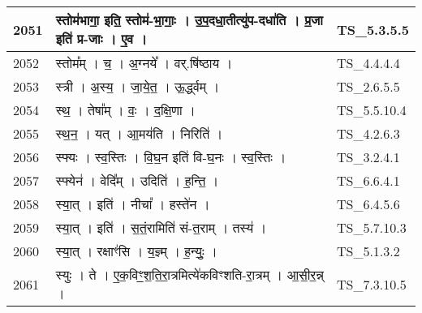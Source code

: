 \documentclass[17pt]{extarticle}
\begin{document}
\begin{longtable}{||p{0.4in}||p{4.9in}||p{0.9in}||}
    2051 & स्तोम॑भागा॒ इति॒ स्तोम॑{-}भा॒गाः॒   ।   उ॒प॒दधा॒तीत्यु॑प{-}दधा॑ति   ।   प्र॒जा इति॑ प्र{-}जाः   ।   ए॒व   ।    & TS\_5.3.5.5       \\
    
    \hline
        
    2052 & स्तोम᳚म्   ।   च॒   ।   अ॒ग्नये᳚   ।   वर्.षि॑ष्ठाय   ।    & TS\_4.4.4.4       \\
    
    \hline
        
    2053 & स्त्री   ।   अ॒स्य॒   ।   जा॒ये॒त॒   ।   ऊ॒र्द्ध्वम्   ।    & TS\_2.6.5.5       \\
    
    \hline
        
    2054 & स्थ॒   ।   तेषा᳚म्   ।   वः॒   ।   द॒क्षि॒णा   ।    & TS\_5.5.10.4       \\
    
    \hline
        
    2055 & स्थ॒न॒   ।   यत्   ।   आ॒मय॑ति   ।   निरिति॑   ।    & TS\_4.2.6.3       \\
    
    \hline
        
    2056 & स्फ्यः   ।   स्व॒स्तिः   ।   वि॒घ॒न इति॑ वि{-}घ॒नः   ।   स्व॒स्तिः   ।    & TS\_3.2.4.1       \\
    
    \hline
        
    2057 & स्फ्येन॑   ।   वेदि᳚म्   ।   उदिति॑   ।   ह॒न्ति॒   ।    & TS\_6.6.4.1       \\
    
    \hline
        
    2058 & स्या॒त्   ।   इति॑   ।   नीचा᳚   ।   हस्ते॑न   ।    & TS\_6.4.5.6       \\
    
    \hline
        
    2059 & स्या॒त्   ।   इति॑   ।   स॒तं॒रामिति॑ सं{-}त॒राम्   ।   तस्य॑   ।    & TS\_5.7.10.3       \\
    
    \hline
        
    2060 & स्या॒त्   ।   रक्षाꣳ॑सि   ।   य॒ज्ञ्म्   ।   ह॒न्युः॒   ।    & TS\_5.1.3.2       \\
    
    \hline
        
    2061 & स्युः   ।   ते   ।   ए॒क॒विꣳ॒॒श॒ति॒रा॒त्रमित्ये॑कविꣳशति{-}रा॒त्रम्   ।   आ॒सी॒र॒न्न्   ।    & TS\_7.3.10.5       \\
    

\end{longtable}
\end{document}
